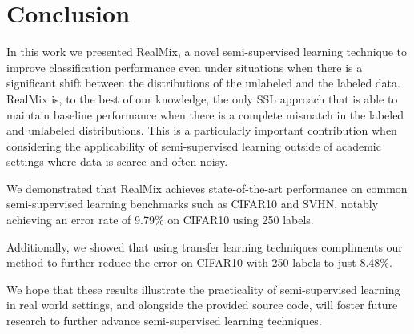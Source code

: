 \documentclass[10pt,twocolumn,letterpaper]{article}
\begin{document}
\section{Conclusion}

In this work we presented RealMix, a novel semi-supervised learning technique to improve classification performance even under situations when there is a significant shift between the distributions of the unlabeled and the labeled data.
RealMix is, to the best of our knowledge, the only SSL approach that is able to maintain baseline performance when there is a complete mismatch in the labeled and unlabeled distributions. This is a particularly important contribution when considering the applicability of semi-supervised learning outside of academic settings where data is scarce and often noisy.

We demonstrated that RealMix achieves state-of-the-art performance on common semi-supervised learning benchmarks such as CIFAR10 and SVHN, notably achieving an error rate of 9.79\% on CIFAR10 using 250 labels.

Additionally, we showed that using transfer learning techniques compliments our method to further reduce the error on CIFAR10 with 250 labels to just 8.48\%.

We hope that these results illustrate the practicality of semi-supervised learning in real world settings, and alongside the provided source code, will foster future research to further advance semi-supervised learning techniques.


{\small


}
\end{document}
